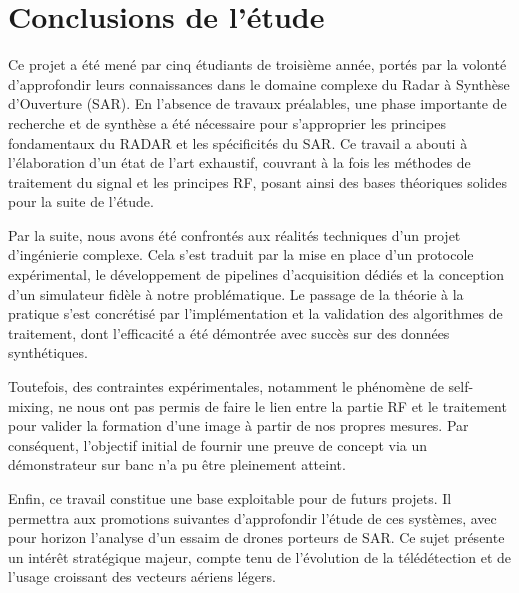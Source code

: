 \chapter{Conclusions de l'étude}
\newpage
Ce projet a été mené par cinq étudiants de troisième année, portés par la volonté d'approfondir leurs connaissances dans le domaine complexe du Radar à Synthèse d'Ouverture (SAR). En l'absence de travaux préalables, une phase importante de recherche et de synthèse a été nécessaire pour s'approprier les principes fondamentaux du RADAR et les spécificités du SAR. Ce travail a abouti à l'élaboration d'un état de l'art exhaustif, couvrant à la fois les méthodes de traitement du signal et les principes RF, posant ainsi des bases théoriques solides pour la suite de l'étude.

Par la suite, nous avons été confrontés aux réalités techniques d'un projet d'ingénierie complexe. Cela s'est traduit par la mise en place d'un protocole expérimental, le développement de pipelines d'acquisition dédiés et la conception d'un simulateur fidèle à notre problématique. Le passage de la théorie à la pratique s'est concrétisé par l'implémentation et la validation des algorithmes de traitement, dont l'efficacité a été démontrée avec succès sur des données synthétiques.

Toutefois, des contraintes expérimentales, notamment le phénomène de self-mixing, ne nous ont pas permis de faire le lien entre la partie RF et le traitement pour valider la formation d'une image à partir de nos propres mesures. Par conséquent, l'objectif initial de fournir une preuve de concept via un démonstrateur sur banc n'a pu être pleinement atteint.

Enfin, ce travail constitue une base exploitable pour de futurs projets. Il permettra aux promotions suivantes d'approfondir l'étude de ces systèmes, avec pour horizon l'analyse d'un essaim de drones porteurs de SAR. Ce sujet présente un intérêt stratégique majeur, compte tenu de l'évolution de la télédétection et de l'usage croissant des vecteurs aériens légers.